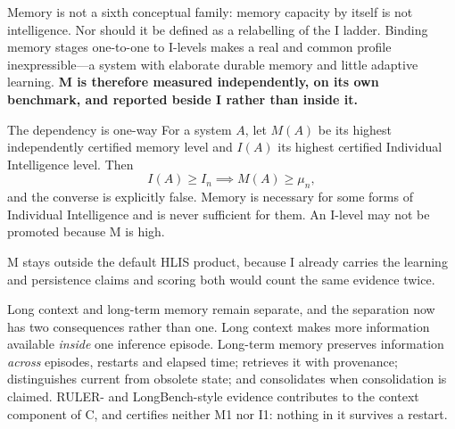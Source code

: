 \documentclass[11pt]{article}
\theoremstyle{definition}
\begin{document}
Memory is not a sixth conceptual family: memory capacity by itself is not intelligence. Nor should it be defined as a relabelling of the I ladder. Binding memory stages one-to-one to I-levels makes a real and common profile inexpressible---a system with elaborate durable memory and little adaptive learning. \textbf{M is therefore measured independently, on its own benchmark, and reported beside I rather than inside it.}

\begin{claimbox}{The dependency is one-way}
For a system $A$, let $M(A)$ be its highest independently certified memory level and $I(A)$ its highest certified Individual Intelligence level. Then
\[ I(A) \ge I_n \implies M(A) \ge \mu_n, \]
and the converse is explicitly false. Memory is necessary for some forms of Individual Intelligence and is never sufficient for them. An I-level may not be promoted because M is high.

M stays outside the default HLIS product, because I already carries the learning and persistence claims and scoring both would count the same evidence twice.
\end{claimbox}

Long context and long-term memory remain separate, and the separation now has two consequences rather than one. Long context makes more information available \emph{inside} one inference episode. Long-term memory preserves information \emph{across} episodes, restarts and elapsed time; retrieves it with provenance; distinguishes current from obsolete state; and consolidates when consolidation is claimed. RULER- and LongBench-style evidence contributes to the context component of C, and certifies neither M1 nor I1: nothing in it survives a restart.
\end{document}

